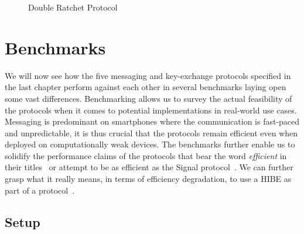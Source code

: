 \documentclass[11pt,a4paper,twoside,openright,bibliography=totoc]{scrbook}
\begin{document}
\begin{figure}[ht]
  \centering
  \setlength{\fboxsep}{10pt}
  \scalebox{0.9}{%
    \fbox{%
      
    }
  }
  \caption{Double Ratchet Protocol}
  \label{fig:double-ratchet}
\end{figure}

\chapter{Benchmarks}
\label{chap:benchmarks}

We will now see how the five messaging and key-exchange protocols
specified in the last chapter perform against each other in
several benchmarks laying open some vast differences.
Benchmarking allows us to survey the actual feasibility
of the protocols when it comes to potential implementations
in real-world use cases. Messaging is predominant
on smartphones where the communication is fast-paced
and unpredictable, it is thus crucial that the protocols
remain efficient even when deployed on computationally
weak devices. The benchmarks further enable us to
solidify the performance claims of the protocols
that bear the word \textit{efficient} in their
titles~\cite{durak2018bidirectional,jostefficient} or
attempt to be as efficient as the Signal protocol~\cite{alwen2018double}.
We can further grasp what it really means, in terms
of efficiency degradation, to use a HIBE as part
of a protocol~\cite{poettering2018towards,jaeger2018optimal}.

\section{Setup}
\label{sec:setup}
\end{document}
